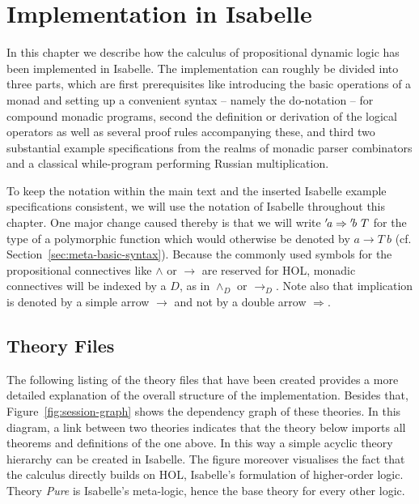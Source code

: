 
\chapter{Implementation in Isabelle}
\label{cha:implementation}

In this chapter we describe how the calculus of propositional dynamic logic has
been implemented in Isabelle. The implementation can roughly be divided into
three parts, which are first prerequisites like introducing the basic operations
of a monad and setting up a convenient syntax -- namely the do-notation -- for
compound monadic programs, second the definition or derivation of the logical
operators as well as several proof rules accompanying these, and third two
substantial example specifications from the realms of monadic parser combinators and
a classical while-program performing Russian multiplication.

To keep the notation within the main text and the inserted Isabelle example
specifications consistent, we will use the notation of Isabelle throughout this
chapter. One major change caused thereby is that we will write ${'\!\mathit{a}} \Rightarrow
{'\!\mathit{b}}\ T$ for the type of a polymorphic function which would otherwise be
denoted by $a \to T\ b$ (cf. Section~\ref{sec:meta-basic-syntax}). Because the commonly
used symbols for the propositional connectives like $\land$ or $\longrightarrow$ are 
reserved for HOL, monadic connectives will be indexed by a $D$, as in $\land_D$
or $\longrightarrow_D$. Note also that implication is denoted by a simple arrow $\longrightarrow$ and not by
a double arrow $\Rightarrow$.

\section{Theory Files}

The following listing of the theory files that have been created provides a more
detailed explanation of the overall structure of the implementation. Besides
that, Figure~\ref{fig:session-graph} shows the dependency graph of these
theories. In this diagram, a link between two theories indicates that the theory
below imports all theorems and definitions of the one above. In this way a simple
acyclic theory hierarchy can be created in Isabelle. The figure moreover
visualises the fact that the calculus directly builds on HOL, Isabelle's
formulation of higher-order logic. Theory \textit{Pure} is Isabelle's
meta-logic, hence the base theory for every other logic.

